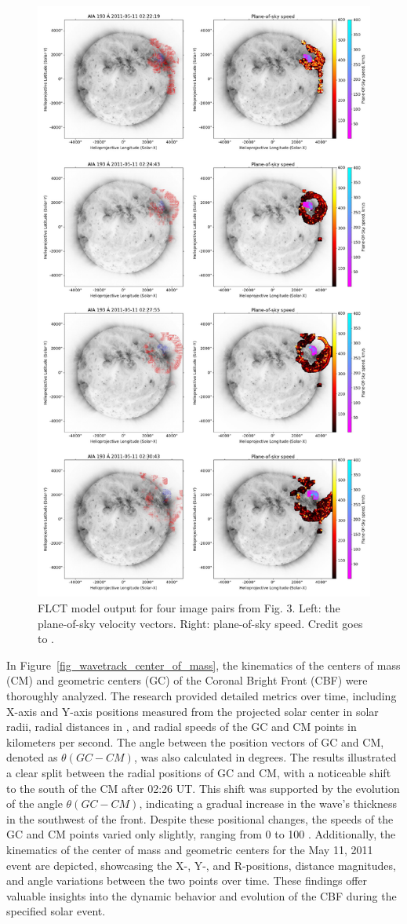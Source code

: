 \begin{figure}[!htp]
	\centering
	\includegraphics[width=0.7\hsize]{chapter2/figs/flct_wave_filament_doubleplot_figure_110511.png}
	\caption{FLCT model output for four image pairs from Fig. 3. Left: the plane-of-sky velocity vectors. Right: plane-of-sky speed. Credit goes to \citet{stepanyuk_2022}.}
	\label{fig_flct_110511}
\end{figure}

In Figure~\ref{fig_wavetrack_center_of_mass}, the kinematics of the centers of mass (CM) and geometric centers (GC) of the Coronal Bright Front (CBF) were thoroughly analyzed. The research provided detailed metrics over time, including X-axis and Y-axis positions measured from the projected solar center in solar radii, radial distances in \rsun, and radial speeds of the GC and CM points in kilometers per second. The angle between the position vectors of GC and CM, denoted as $\theta(GC-CM)$, was also calculated in degrees. The results illustrated a clear split between the radial positions of GC and CM, with a noticeable shift to the south of the CM after 02:26 UT. This shift was supported by the evolution of the angle $\theta(GC-CM)$, indicating a gradual increase in the wave's thickness in the southwest of the front. Despite these positional changes, the speeds of the GC and CM points varied only slightly, ranging from 0 to 100 \kms. Additionally, the kinematics of the center of mass and geometric centers for the May 11, 2011 event are depicted, showcasing the X-, Y-, and R-positions, distance magnitudes, and angle variations between the two points over time. These findings offer valuable insights into the dynamic behavior and evolution of the CBF during the specified solar event.


